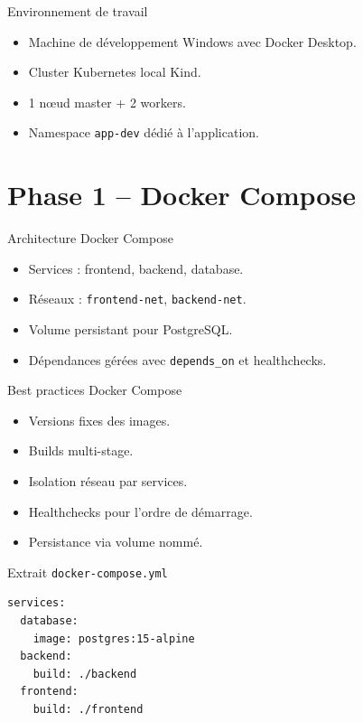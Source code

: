 \documentclass[11pt]{beamer}
\begin{document}
\begin{frame}{Environnement de travail}
  \begin{itemize}
    \item Machine de développement Windows avec Docker Desktop.
    \item Cluster Kubernetes local Kind.
    \item 1 nœud master + 2 workers.
    \item Namespace \texttt{app-dev} dédié à l'application.
  \end{itemize}
\end{frame}

\section{Phase 1 -- Docker Compose}
\begin{frame}{Architecture Docker Compose}
  \begin{itemize}
    \item Services : frontend, backend, database.
    \item Réseaux : \texttt{frontend-net}, \texttt{backend-net}.
    \item Volume persistant pour PostgreSQL.
    \item Dépendances gérées avec \texttt{depends\_on} et healthchecks.
  \end{itemize}
\end{frame}

\begin{frame}[fragile]{Best practices Docker Compose}
  \begin{itemize}
    \item Versions fixes des images.
    \item Builds multi-stage.
    \item Isolation réseau par services.
    \item Healthchecks pour l'ordre de démarrage.
    \item Persistance via volume nommé.
  \end{itemize}
\end{frame}

\begin{frame}[fragile]{Extrait \texttt{docker-compose.yml}}
\begin{lstlisting}
services:
  database:
    image: postgres:15-alpine
  backend:
    build: ./backend
  frontend:
    build: ./frontend
\end{lstlisting}
\end{frame}
\end{document}
